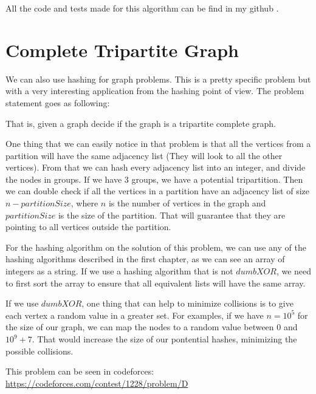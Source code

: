 All the code and tests made for this algorithm can be find in my github \cite{GithubRepo}.

\section{Complete Tripartite Graph}

We can also use hashing for graph problems. This is a pretty specific problem but with a very interesting application from the hashing point of view. The problem statement goes as following:

\medskip


That is, given a graph decide if the graph is a tripartite complete graph. 

One thing that we can easily notice in that problem is that all the vertices from a partition will have the same adjacency list (They will look to all the other vertices). From that we can hash every adjacency list into an integer, and divide the nodes in groups. If we have 3 groups, we have a potential tripartition. Then we can double check if all the vertices in a partition have an adjacency list of size \( n - partitionSize \), where \( n \) is the number of vertices in the graph and \( partitionSize \) is the size of the partition. That will guarantee that they are pointing to all vertices outside the partition.

For the hashing algorithm on the solution of this problem, we can use any of the hashing algorithms described in the first chapter, as we can see an array of integers as a string. If we use a hashing algorithm that is not \( dumbXOR \), we need to first sort the array to ensure that all equivalent lists will have the same array.

If we use \( dumbXOR \), one thing that can help to minimize collisions is to give each vertex a random value in a greater set. For examples, if we have \( n = 10^5 \) for the size of our graph, we can map the nodes to a random value between \( 0 \) and \( 10^9 + 7 \). That would increase the size of our pontential hashes, minimizing the possible collisions.

This problem can be seen in codeforces: \url{https://codeforces.com/contest/1228/problem/D}

